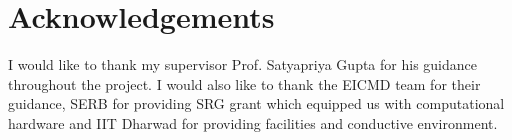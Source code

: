 \chapter*{\centering Acknowledgements}
  {\fontsize{14}{16}\selectfont I would like to thank my supervisor Prof. Satyapriya Gupta for his guidance throughout the project. I would also like to thank the EICMD team for their guidance, SERB for providing SRG grant which equipped us with computational hardware and IIT Dharwad for providing facilities and conductive environment.}